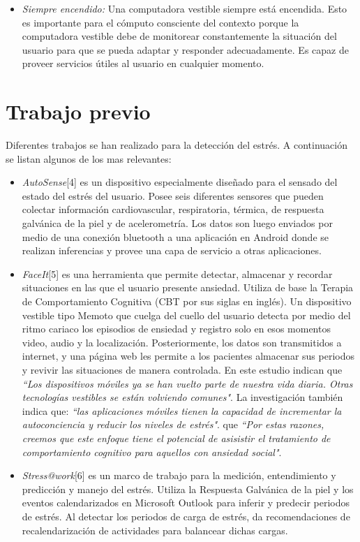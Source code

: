 \documentclass[letterpaper,12pt]{cicese}
\begin{document}
				\begin{itemize}
					\item{\emph{Siempre encendido:}} Una computadora vestible siempre est\'a encendida. Esto es importante para el c\'omputo consciente del contexto
					porque la computadora vestible debe de monitorear constantemente la situaci\'on del usuario para que se pueda adaptar y responder
					adecuadamente. Es capaz de proveer servicios \'utiles al usuario en cualquier momento.
				\end{itemize}

		\chapter{Trabajo previo}
				Diferentes trabajos se han realizado para la detecci\'on del estr\'es. A continuaci\'on se listan algunos de los mas relevantes:
				\begin{itemize}
					\item{\emph{AutoSense}[4]} es un dispositivo especialmente dise\~nado para el sensado del estado del estr\'es del usuario. Posee seis diferentes
					sensores que pueden colectar informaci\'on cardiovascular, respiratoria, térmica, de respuesta galv\'anica de la piel y de acelerometr\'ia. Los
					datos son luego enviados por medio de una conexi\'on bluetooth a una aplicaci\'on en Android donde se realizan inferencias y provee una capa de 
					servicio a otras aplicaciones.
		
					\item{\emph{FaceIt}[5]} es una herramienta que permite detectar, almacenar y recordar situaciones en las que el usuario presente ansiedad. Utiliza
					de base la Terapia de Comportamiento Cognitiva (CBT por sus siglas en ingl\'es). Un dispositivo vestible tipo Memoto que cuelga del cuello del usuario
					detecta por medio del ritmo cariaco los episodios de ensiedad y registro solo en esos momentos video, audio y la localizaci\'on. Posteriormente,
					los datos son transmitidos a internet, y una p\'agina web les permite a los pacientes almacenar sus periodos y revivir las situaciones de manera
					controlada. En este estudio indican que \emph{``Los dispositivos m\'oviles ya se han vuelto parte de nuestra vida diaria. Otras tecnolog\'ias vestibles 					se est\'an volviendo comunes"}. La investigaci\'on tambi\'en indica que: \emph{``las aplicaciones m\'oviles tienen la capacidad de incrementar
					la autoconciencia y reducir los niveles de estr\'es"}.  que \emph{``Por estas razones, creemos que este enfoque tiene el potencial de asisistir
					el tratamiento de comportamiento cognitivo para aquellos con ansiedad social"}.

					\item{\emph{Stress@work}[6]} es un marco de trabajo para la medici\'on, entendimiento y predicci\'on y manejo del estr\'es. Utiliza la Respuesta
					Galv\'anica de la piel y los eventos calendarizados en Microsoft Outlook para inferir y predecir periodos de estr\'es. Al detectar los periodos de
					carga de estr\'es, da recomendaciones de recalendarizaci\'on de actividades para balancear dichas cargas.
				\end{itemize}
\end{document}
